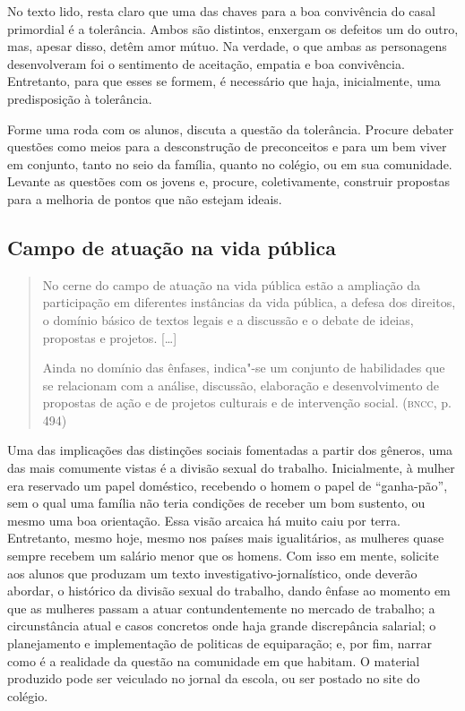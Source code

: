 \documentclass[12pt]{extarticle}
\begin{document}
No texto lido, resta claro que uma das chaves para a boa convivência
do casal primordial é a tolerância. Ambos são distintos, enxergam os
defeitos um do outro, mas, apesar disso, detêm amor mútuo. Na verdade,
o que ambas as personagens desenvolveram foi o sentimento de
aceitação, empatia e boa convivência. Entretanto, para que esses se
formem, é necessário que haja, inicialmente, uma predisposição à
tolerância.

Forme uma roda com os alunos, discuta a questão da tolerância. Procure
debater questões como meios para a desconstrução de preconceitos e para
um bem viver em conjunto, tanto no seio da família, quanto no colégio,
ou em sua comunidade. Levante as questões com os jovens e, procure,
coletivamente, construir propostas para a melhoria de pontos que não
estejam ideais.

\subsection{Campo de atuação na vida pública}

\begin{quote}
No cerne do campo de atuação na vida pública estão a ampliação da
participação em diferentes instâncias da vida pública, a defesa dos
direitos, o domínio básico de textos legais e a discussão e o debate de
ideias, propostas e projetos. {[}\ldots{}{]}

Ainda no domínio das ênfases, indica"-se um conjunto de habilidades que
se relacionam com a análise, discussão, elaboração e desenvolvimento de
propostas de ação e de projetos culturais e de intervenção social.
(\textsc{bncc}, p. 494)
\end{quote}

Uma das implicações das distinções sociais fomentadas a partir dos
gêneros, uma das mais comumente vistas é a divisão sexual do trabalho.
Inicialmente, à mulher era reservado um papel doméstico, recebendo o
homem o papel de ``ganha-pão'', sem o qual uma família não teria
condições de receber um bom sustento, ou mesmo uma boa orientação.
Essa visão arcaica há muito caiu por terra. Entretanto, mesmo hoje,
mesmo nos países mais igualitários, as mulheres quase sempre recebem
um salário menor que os homens. Com isso em mente, solicite aos alunos
que produzam um texto investigativo-jornalístico, onde deverão
abordar, o histórico da divisão sexual do trabalho, dando ênfase ao
momento em que as mulheres passam a atuar contundentemente no mercado
de trabalho; a circunstância atual e casos concretos onde haja grande
discrepância salarial; o planejamento e implementação de politicas de
equiparação; e, por fim, narrar como é a realidade da questão na
comunidade em que habitam. O material produzido pode ser veiculado no
jornal da escola, ou ser postado no site do colégio.
\end{document}
